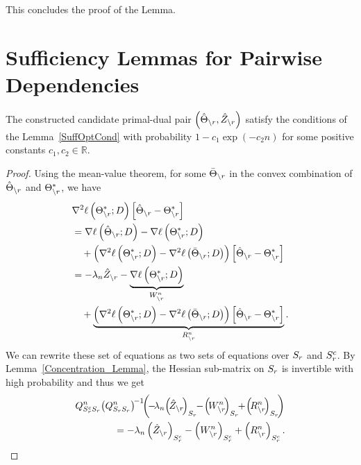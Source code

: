 This concludes the proof of the Lemma.

\section{Sufficiency Lemmas for Pairwise Dependencies}
\begin{lemma}
The constructed candidate primal-dual pair $\left(\hat{\Theta}_{\backslash r},\hat{Z}_{\backslash r}\right)$ satisfy the conditions of the Lemma~\ref{SuffOptCond} with probability $1-c_1\exp(-c_2n)$ for some positive constants $c_1,c_2\in\mathbb{R}$.
\label{OptCertificate}
\end{lemma}

\begin{proof}
Using the mean-value theorem, for some $\bar{\Theta}_{\backslash r}$ in the convex combination of $\hat{\Theta}_{\backslash r}$ and $\Theta^*_{\backslash r}$, we have
\begin{equation}
\begin{aligned}
&\nabla^2\ell\left(\Theta^*_{\backslash r};D\right)\left[\hat{\Theta}_{\backslash r}-\Theta^*_{\backslash r}\right]\\ &=\nabla\ell\left(\hat{\Theta}_{\backslash r};D\right)-\nabla\ell\left(\Theta^*_{\backslash r};D\right)\\ &\quad+\left(\nabla^2\ell\left(\Theta^*_{\backslash r};D\right)-\nabla^2\ell\left(\bar{\Theta}_{\backslash r};D\right)\right)\left[\hat{\Theta}_{\backslash r}-\Theta^*_{\backslash r}\right]\\
&=-\lambda_n\hat{Z}_{\backslash r}-\underbrace{\nabla\ell\left(\Theta^*_{\backslash r};D\right)}_{W_{\backslash r}^n}\\ &\quad+\underbrace{\left(\nabla^2\ell\left(\Theta^*_{\backslash r};D\right)-\nabla^2\ell\left(\bar{\Theta}_{\backslash r};D\right)\right) \left[\hat{\Theta}_{\backslash r}-\Theta^*_{\backslash r}\right]}_{R_{\backslash r}^n}.\\
\end{aligned}
\nonumber
\end{equation}
We can rewrite these set of equations as two sets of equations over $S_{r}$ and $S_{r}^c$. By Lemma~\ref{Concentration_Lemma}, the Hessian sub-matrix on $S_{r}$ is invertible with high probability and thus we get
\begin{equation}
\begin{aligned}
&\fisher^n_{\support_\svert^c\support_\svert} \!\left(\fisher^n_{\support_\svert\support_\svert}\right)^{\!-1}\!\! \left(\!-\!\regpar_n\!\left(\!\hat{\dual}_{\backslash\svert}\!\right)_{\support_\svert} \!\!-\!\left(\!W_{\backslash\svert}^n\!\right)_{\support_\svert} \!\!+\!\left(\!R_{\backslash\svert}^n\!\right)_{\support_\svert}\!\right)\\ &\qquad\qquad=-\regpar_n\left(\hat{\dual}_{\backslash\svert}\right)_{\support_\svert^c} -\left(W_{\backslash\svert}^n\right)_{\support_\svert^c} +\left(R_{\backslash\svert}^n\right)_{\support_\svert^c}.

\end{aligned}
\end{equation}
\end{proof}
